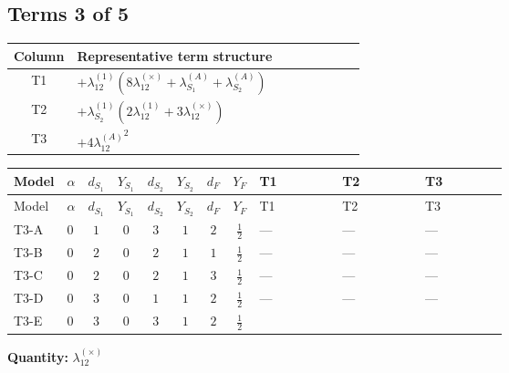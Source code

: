 \documentclass[8pt]{article}
\begin{document}
\begin{landscape}
\subsection*{Terms 3 of 5}
\begin{center}
\begin{tabular}{@{}c >{\raggedright\arraybackslash}p{0.82\linewidth}@{}}
\toprule
Column & Representative term structure \\
\midrule
T1 & \(\displaystyle +{\lambda_{12}^{(1)}} (8 {\lambda_{12}^{(\times)}}+{\lambda_{S_1}^{(A)}}+{\lambda_{S_2}^{(A)}})\) \\
\midrule
T2 & \(\displaystyle +{\lambda_{S_2}^{(1)}} (2 {\lambda_{12}^{(1)}}+3 {\lambda_{12}^{(\times)}})\) \\
\midrule
T3 & \(\displaystyle +4 {\lambda_{12}^{(A)}}^2\) \\
\midrule
\bottomrule
\end{tabular}
\end{center}
\smallskip
\tiny
\begin{longtable}{@{}llcccccc >{\raggedright\arraybackslash}p{0.21\linewidth} >{\raggedright\arraybackslash}p{0.21\linewidth} >{\raggedright\arraybackslash}p{0.21\linewidth}@{}}
\toprule
Model & $\alpha$ & $d_{S_1}$ & $Y_{S_1}$ & $d_{S_2}$ & $Y_{S_2}$ & $d_F$ & $Y_F$ & T1 & T2 & T3 \\
\midrule
\endfirsthead
\toprule
Model & $\alpha$ & $d_{S_1}$ & $Y_{S_1}$ & $d_{S_2}$ & $Y_{S_2}$ & $d_F$ & $Y_F$ & T1 & T2 & T3 \\
\midrule
\endhead
T3-A & $0$ & $1$ & $0$ & $3$ & $1$ & $2$ & $\frac{1}{2}$ & --- & --- & --- \\
\midrule
T3-B & $0$ & $2$ & $0$ & $2$ & $1$ & $1$ & $\frac{1}{2}$ & --- & --- & --- \\
\midrule
T3-C & $0$ & $2$ & $0$ & $2$ & $1$ & $3$ & $\frac{1}{2}$ & --- & --- & --- \\
\midrule
T3-D & $0$ & $3$ & $0$ & $1$ & $1$ & $2$ & $\frac{1}{2}$ & --- & --- & --- \\
\midrule
T3-E & $0$ & $3$ & $0$ & $3$ & $1$ & $2$ & $\frac{1}{2}$ & \scriptsize\adjustbox{max width=\linewidth}{$\begin{gathered} +{\lambda_{12}^{(1)}} (8 {\lambda_{12}^{(\times)}}+{\lambda_{S_1}^{(A)}}+{\lambda_{S_2}^{(A)}})\end{gathered}$} & \scriptsize\adjustbox{max width=\linewidth}{$\begin{gathered} +{\lambda_{S_2}^{(1)}} (2 {\lambda_{12}^{(1)}}+3 {\lambda_{12}^{(\times)}})\end{gathered}$} & \scriptsize\adjustbox{max width=\linewidth}{$\begin{gathered} +4 {\lambda_{12}^{(A)}}^2\end{gathered}$} \\
\midrule
\bottomrule
\end{longtable}
\clearpage
\noindent\textbf{Quantity: }$\lambda_{12}^{(\times)}$\par\smallskip

\end{landscape}
\end{document}
